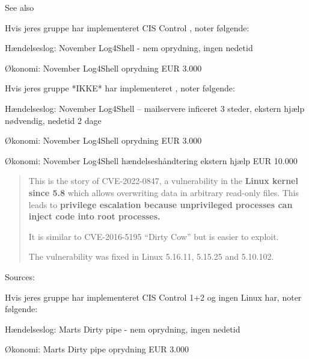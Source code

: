 \documentclass[Screen16to9,17pt]{foils}
\begin{document}
See also 




Hvis jeres gruppe har implementeret CIS Control , noter følgende:
\begin{list2}
\item Hændelseslog: November Log4Shell - nem oprydning, ingen nedetid
\item Økonomi: November Log4Shell oprydning EUR 3.000
\end{list2}


Hvis jeres gruppe *IKKE* har implementeret , noter følgende:
\begin{list2}
\item Hændelseslog: November Log4Shell -- mailservere inficeret 3 steder, ekstern hjælp nødvendig, nedetid 2 dage
\item Økonomi: November Log4Shell oprydning EUR 3.000
\item Økonomi: November Log4Shell hændelseshåndtering ekstern hjælp EUR 10.000
\end{list2}





\begin{quote}
This is the story of CVE-2022-0847, a vulnerability in the {\bf Linux kernel since 5.8} which allows overwriting data in arbitrary read-only files. This leads to {\bf privilege escalation because unprivileged processes can inject code into root processes.}

It is similar to CVE-2016-5195 “Dirty Cow” but is easier to exploit.

The vulnerability was fixed in Linux 5.16.11, 5.15.25 and 5.10.102.
\end{quote}
Sources:



Hvis jeres gruppe har implementeret CIS Control 1+2 og ingen Linux har, noter følgende:
\begin{list2}
\item Hændelseslog: Marts Dirty pipe - nem oprydning, ingen nedetid
\item Økonomi: Marts Dirty pipe oprydning EUR 3.000
\end{list2}
\end{document}

